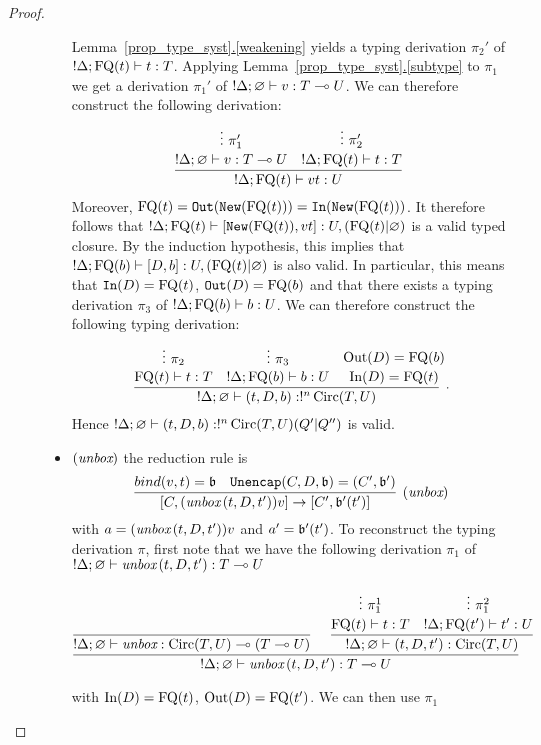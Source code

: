\documentclass[twoside]{article}
\begin{document}
\begin{proof}
\begin{description}
\begin{itemize}
  Lemma~\hyperref[weakening]{\ref*{prop_type_syst}.\ref*{weakening}} yields a typing 
  derivation $\pi_2'$ of $!\Delta;\mathop{\textrm{FQ}}\nolimits(t)\vdash t:T$. 
  Applying Lemma~\hyperref[subtype]{\ref*{prop_type_syst}.\ref*{subtype}}
  to $\pi_1$ we get a derivation $\pi_1'$ of $!\Delta ;\varnothing\vdash v:T\multimap U$.
  We can therefore construct the following derivation:
  \[
  \infer[]{!\Delta;\FQ(t)\entails vt : U}{
    \deduce[]{!\Delta ;\varnothing\entails v:T\loli U}{
      \vdots ~\pi_1'
    }
    &
    \deduce[]{!\Delta;\FQ(t)\entails t:T}{
      \vdots ~\pi_2'
    }
  }
  \]
  Moreover, $\mathop{\textrm{FQ}}\nolimits(t)=\mathtt{Out}(\mathtt{New}(\mathop{\textrm{FQ}}\nolimits(t)))=\mathtt{In}(\mathtt{New}(\mathop{\textrm{FQ}}\nolimits(t)))$. 
  It therefore follows that $!\Delta;\mathop{\textrm{FQ}}\nolimits(t)\vdash [\mathtt{New}(\mathop{\textrm{FQ}}\nolimits(t)),vt]:U,(\mathop{\textrm{FQ}}\nolimits(t)|\varnothing)$ 
  is a valid typed closure. By the induction hypothesis, this implies that 
  $!\Delta;\mathop{\textrm{FQ}}\nolimits(b)\vdash [D,b]:U,(\mathop{\textrm{FQ}}\nolimits(t)|\varnothing)$ is also valid.
  In particular, this means that $\mathtt{In}(D)=\mathop{\textrm{FQ}}\nolimits(t)$, $\mathtt{Out}(D)=\mathop{\textrm{FQ}}\nolimits(b)$ 
  and that there exists a typing derivation $\pi_3$ of $!\Delta;\mathop{\textrm{FQ}}\nolimits(b)\vdash b:U$.
  We can therefore construct the following typing derivation:
  \[
  \infer[.]{!\Delta;\varnothing \entails (t,D,b):!^n\Circ(T,U)}{
    \deduce[]{\FQ(t)\entails t:T}{
      \vdots~\pi_2
    }
    &
    \deduce[]{!\Delta ; \FQ(b)\entails b:U}{
      \vdots~\pi_3
    } 
    &
    \deduce[]{\In(D)=\FQ(t) }{
      \Out(D)=\FQ(b)
    }
  }
  \]  
  Hence $!\Delta ;\varnothing \vdash (t,D,b):!^n\mathop{\textrm{Circ}}\nolimits(T,U) (Q'|Q'')$ is valid.
  \item $(\mathop{\textit{unbox}}\nolimits)$ the reduction rule is
  \[
    \infer[(\unbox)]{[C,(\unbox\,(t,D,t'))v]\to [C',\binding'(t')]}{
      bind(v,t)=\binding 
      &
      \mathtt{Unencap}(C,D,\binding) = (C',\binding') 
    }
  \]
  with $a=(\mathop{\textit{unbox}}\nolimits\,(t,D,t'))v$ and $a'=\mathfrak{b}'(t')$. 
  To reconstruct the typing derivation $\pi$, first note 
  that we have the following derivation $\pi_1$ of    
  $!\Delta;\varnothing\vdash \mathop{\textit{unbox}}\nolimits\,(t,D,t'):T\multimap U$
  \begin{footnotesize}
  \[
    \infer[]{!\Delta;\varnothing\entails \unbox\,(t,D,t'):T\loli U}{
      \infer[]{!\Delta;\varnothing \entails \unbox:\Circ(T,U)\loli (T\loli U)}{
      }   
      &
      \infer[]{!\Delta ;\varnothing\entails (t,D,t'):\Circ(T,U)}{
        \deduce[]{\FQ(t)\entails t:T}{
          \vdots ~\pi_1^1
        }
        &
        \deduce[]{!\Delta;\FQ(t')\entails t':U}{
          \vdots ~\pi_1^2     
        }
      }
    }
    \]
    \end{footnotesize} 
  with $\mathop{\textrm{In}}\nolimits(D)=\mathop{\textrm{FQ}}\nolimits(t)$, $\mathop{\textrm{Out}}\nolimits(D)=\mathop{\textrm{FQ}}\nolimits(t')$. We can then use $\pi_1$ 

\end{itemize}
\end{description}
\end{proof}
\end{document}
